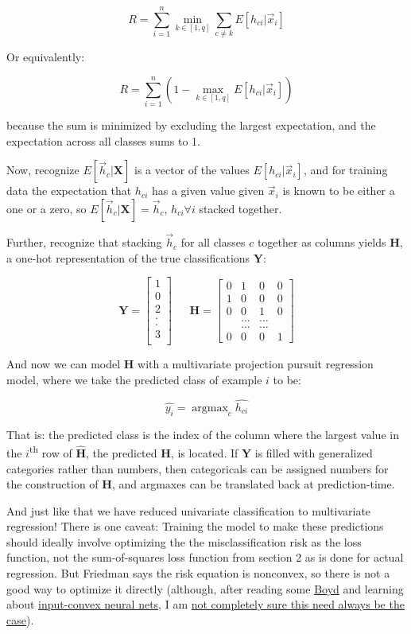 \documentclass[12pt]{article}
\DeclareMathOperator*{\argmax}{argmax}
\begin{document}
$$R = \sum_{i=1}^n \min_{k \in [1,q]} \sum_{c \neq k} E[h_{ci} | \vec{x}_i]$$

Or equivalently:

$$R = \sum_{i=1}^n (1 - \max_{k \in [1,q]} E[h_{ci} | \vec{x}_i])$$

because the sum is minimized by excluding the largest expectation, and the expectation across all classes sums to 1.

Now, recognize $E[\vec{h}_c | \pmb{X}]$ is a vector of the values $E[h_{ci} | \vec{x}_i]$, and for training data the expectation that $h_{ci}$ has a given value given $\vec{x}_i$ is known to be either a one or a zero, so $E[\vec{h}_c | \pmb{X}] = \vec{h}_c$, $h_{ci} \forall i$ stacked together.

Further, recognize that stacking $\vec{h}_c$ for all classes $c$ together as columns yields $\pmb{H}$, a one-hot representation of the true classifications $\pmb{Y}$:

\[
\pmb{Y} =
\begin{bmatrix}
1\\
0\\
2\\
.\\
.\\
3\\
\end{bmatrix}
\ \ \ \ \ \ \ \pmb{H} =
\begin{bmatrix}
0 & 1 & 0 & 0\\
1 & 0 & 0 & 0\\
0 & 0 & 1 & 0\\
& \hdots & \hdots\\
& \hdots & \hdots\\
0 & 0 & 0 & 1
\end{bmatrix}
\]

And now we can model $\pmb{H}$ with a multivariate projection pursuit regression model, where we take the predicted class of example $i$ to be:

$$\hat{y_i} = \argmax_c \hat{h_{ci}} $$

That is: the predicted class is the index of the column where the largest value in the $i$\textsuperscript{th} row of $\hat{\pmb{H}}$, the predicted $\pmb{H}$, is located. If $\pmb{Y}$ is filled with generalized categories rather than numbers, then categoricals can be assigned numbers for the construction of $\pmb{H}$, and argmaxes can be translated back at prediction-time.

And just like that we have reduced univariate classification to multivariate regression! There is one caveat: Training the model to make these predictions should ideally involve optimizing the the misclassification risk as the loss function, not the sum-of-squares loss function from section 2 as is done for actual regression. But Friedman says the risk equation is nonconvex, so there is not a good way to optimize it directly (although, after reading some \href{https://web.stanford.edu/~boyd/cvxbook/bv_cvxbook.pdf}{Boyd} and learning about \href{https://stats.stackexchange.com/a/662866/140965}{input-convex neural nets}, I am \href{https://math.stackexchange.com/questions/5047615/is-this-empirical-risk-minimization-function-really-non-convex}{not completely sure this need always be the case}).
\end{document}
